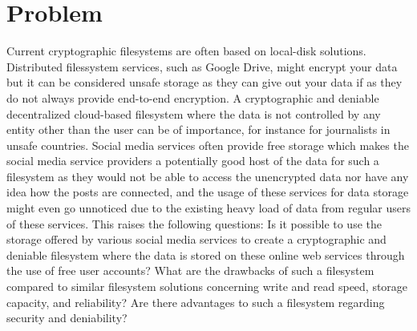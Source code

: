 
\section{Problem}
\label{sec:problem}

Current cryptographic filesystems are often based on \mbox{local-disk} solutions. Distributed filessystem services, such as Google Drive, might encrypt your data but it can be considered unsafe storage as they can give out your data if as they do not always provide \mbox{end-to-end} encryption. A cryptographic and deniable decentralized \mbox{cloud-based} filesystem where the data is not controlled by any entity other than the user can be of importance, for instance for journalists in unsafe countries. Social media services often provide free storage which makes the social media service providers a potentially good host of the data for such a filesystem as they would not be able to access the unencrypted data nor have any idea how the posts are connected, and the usage of these services for data storage might even go unnoticed due to the existing heavy load of data from regular users of these services. This raises the following questions: Is it possible to use the storage offered by various social media services to create a cryptographic and deniable filesystem where the data is stored on these online web services through the use of free user accounts? What are the drawbacks of such a filesystem compared to similar filesystem solutions concerning write and read speed, storage capacity, and reliability? Are there advantages to such a filesystem regarding security and deniability? 



